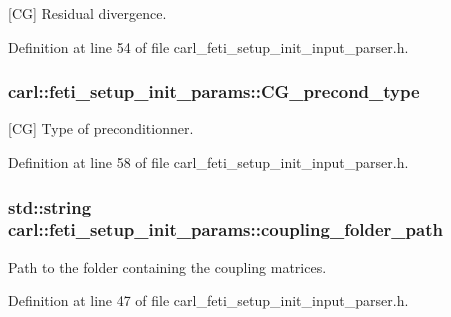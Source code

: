\mbox{[}C\+G\mbox{]} Residual divergence. 



Definition at line 54 of file carl\+\_\+feti\+\_\+setup\+\_\+init\+\_\+input\+\_\+parser.\+h.

\hypertarget{structcarl_1_1feti__setup__init__params_a118e1fe1c87a75663fb50c4545524cb8}{}
\subsubsection[{C\+G\+\_\+precond\+\_\+type}]{ carl\+::feti\+\_\+setup\+\_\+init\+\_\+params\+::\+C\+G\+\_\+precond\+\_\+type}\label{structcarl_1_1feti__setup__init__params_a118e1fe1c87a75663fb50c4545524cb8}


\mbox{[}C\+G\mbox{]} Type of preconditionner. 



Definition at line 58 of file carl\+\_\+feti\+\_\+setup\+\_\+init\+\_\+input\+\_\+parser.\+h.

\hypertarget{structcarl_1_1feti__setup__init__params_a5f710f34f0b3bdc9494c79c024fe2603}{}
\subsubsection[{coupling\+\_\+folder\+\_\+path}]{\setlength{\rightskip}{0pt plus 5cm}std\+::string carl\+::feti\+\_\+setup\+\_\+init\+\_\+params\+::coupling\+\_\+folder\+\_\+path}\label{structcarl_1_1feti__setup__init__params_a5f710f34f0b3bdc9494c79c024fe2603}


Path to the folder containing the coupling matrices. 



Definition at line 47 of file carl\+\_\+feti\+\_\+setup\+\_\+init\+\_\+input\+\_\+parser.\+h.

\hypertarget{structcarl_1_1feti__setup__init__params_a90db585fd2b345de1b58f60986785195}{}
